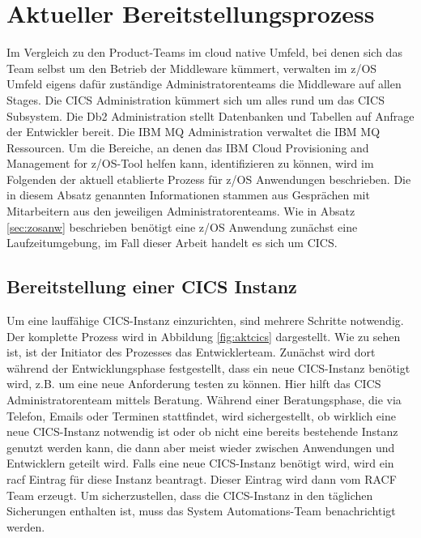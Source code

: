 \section{Aktueller Bereitstellungsprozess}\label{sec:aktbereit}
Im Vergleich zu den Product-Teams im cloud native Umfeld, bei denen sich das Team selbst um den Betrieb der Middleware kümmert, verwalten im z/OS Umfeld eigens dafür zuständige Administratorenteams die Middleware auf allen Stages.
Die \glqq CICS Administration\grqq{} kümmert sich um alles rund um das CICS Subsystem.
Die \glqq Db2 Administration\grqq{} stellt Datenbanken und Tabellen auf Anfrage der Entwickler bereit.
Die \glqq IBM MQ Administration\grqq{} verwaltet die IBM MQ Ressourcen.
Um die Bereiche, an denen das \glqq IBM Cloud Provisioning and Management for z/OS\grqq-Tool helfen kann, identifizieren zu können, wird im Folgenden der aktuell etablierte Prozess für z/OS Anwendungen beschrieben.
Die in diesem Absatz genannten Informationen stammen aus Gesprächen mit Mitarbeitern aus den jeweiligen Administratorenteams.
Wie in Absatz \ref{sec:zosanw} beschrieben benötigt eine z/OS Anwendung zunächst eine Laufzeitumgebung, im Fall dieser Arbeit handelt es sich um CICS.

\subsection{Bereitstellung einer CICS Instanz}\label{ssec:aktcics}
Um eine lauffähige CICS-Instanz einzurichten, sind mehrere Schritte notwendig.
Der komplette Prozess wird in Abbildung \ref{fig:aktcics} dargestellt.
Wie zu sehen ist, ist der Initiator des Prozesses das Entwicklerteam.
Zunächst wird dort während der Entwicklungsphase festgestellt, dass ein neue CICS-Instanz benötigt wird, z.B. um eine neue Anforderung testen zu können. 
Hier hilft das CICS Administratorenteam mittels Beratung.
Während einer Beratungsphase, die via Telefon, Emails oder Terminen stattfindet, wird sichergestellt, ob wirklich eine neue CICS-Instanz notwendig ist oder ob nicht eine bereits bestehende Instanz genutzt werden kann, die dann aber meist wieder zwischen Anwendungen und Entwicklern geteilt wird.
Falls eine neue CICS-Instanz benötigt wird, wird ein \Gls{racf} Eintrag für diese Instanz beantragt.
Dieser Eintrag wird dann vom RACF Team erzeugt.
Um sicherzustellen, dass die CICS-Instanz in den täglichen Sicherungen enthalten ist, muss das System Automations-Team benachrichtigt werden.

